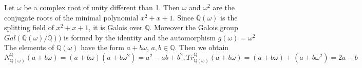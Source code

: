 \documentclass[12pt]{article}
\begin{document}
Let $\omega$ be a complex root of unity different than 1. Then $\omega$ and $\omega^2$ are the conjugate roots of the minimal polynomial $x^2 + x +1$.
 Since $\mathbb{Q}(\omega)$ is the splitting field of $x^2 + x +1$, it is Galois over $\mathbb{Q}$. Moreover the Galois group $Gal(\mathbb{Q}(\omega)/\mathbb{Q}))$ is formed by the identity and the automorphism $g(\omega) = \omega^2$
 The elements of $\mathbb{Q}(\omega)$ have the form $a + b\omega$, $a,b\in \mathbb{Q}$.
 Then we obtain
\[N_{\mathbb{Q}(\omega)}^{\mathbb{Q}}(a + b\omega) = (a +b\omega)(a +b\omega^2) = a^2 - ab + b^2,
Tr_{\mathbb{Q}(\omega)}^{\mathbb{Q}}(a + b\omega) = (a +b\omega) + (a + b\omega^2) = 2a - b \]
\end{document}
